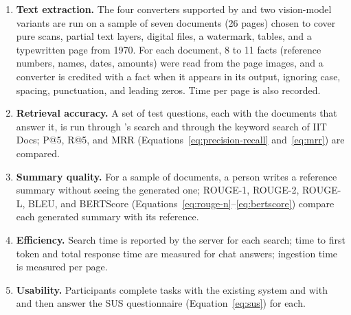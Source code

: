 \begin{enumerate}
  \item \textbf{Text extraction.} The four converters supported by \cs{} and two vision-model variants are run on a sample of seven documents (26 pages) chosen to cover pure scans, partial text layers, digital files, a watermark, tables, and a typewritten page from 1970. For each document, 8 to 11 facts (reference numbers, names, dates, amounts) were read from the page images, and a converter is credited with a fact when it appears in its output, ignoring case, spacing, punctuation, and leading zeros. Time per page is also recorded.
  \item \textbf{Retrieval accuracy.} A set of test questions, each with the documents that answer it, is run through \cs{}'s search and through the keyword search of IIT Docs; P@5, R@5, and MRR (Equations~\ref{eq:precision-recall} and~\ref{eq:mrr}) are compared. 
  \item \textbf{Summary quality.} For a sample of documents, a person writes a reference summary without seeing the generated one; ROUGE-1, ROUGE-2, ROUGE-L, BLEU, and BERTScore (Equations~\ref{eq:rouge-n}--\ref{eq:bertscore}) compare each generated summary with its reference. 
  \item \textbf{Efficiency.} Search time is reported by the server for each search; time to first token and total response time are measured for chat answers; ingestion time is measured per page.
  \item \textbf{Usability.} Participants complete tasks with the existing system and with \cs{} and then answer the SUS questionnaire (Equation~\ref{eq:sus}) for each.
\end{enumerate}
